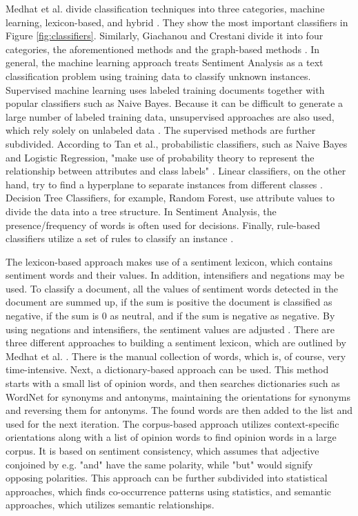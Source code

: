 Medhat et al. divide classification techniques into three categories, machine learning, lexicon-based, and hybrid \cite{MEDHAT20141093}. They show the most important classifiers in Figure \ref{fig:classifiers}. Similarly, Giachanou and Crestani divide it into four categories, the aforementioned methods and the graph-based methods \cite{DBLP:journals/csur/GiachanouC16}. In general, the machine learning approach treats Sentiment Analysis as a text classification problem using training data to classify unknown instances. Supervised machine learning uses labeled training documents together with popular classifiers such as Naive Bayes. Because it can be difficult to generate a large number of labeled training data, unsupervised approaches are also used, which rely solely on unlabeled data \cite{MEDHAT20141093}. The supervised methods are further subdivided. According to Tan et al., probabilistic classifiers, such as Naive Bayes and Logistic Regression, "make use of probability theory to represent the relationship between attributes and class labels" \cite[p.~414]{DBLP:books/aw/TanSKK2019}. Linear classifiers, on the other hand, try to find a hyperplane to separate instances from different classes \cite{MEDHAT20141093}. Decision Tree Classifiers, for example, Random Forest, use attribute values to divide the data into a tree structure. In Sentiment Analysis, the presence/frequency of words is often used for decisions. Finally, rule-based classifiers utilize a set of rules to classify an instance \cite{DBLP:books/aw/TanSKK2019}.

The lexicon-based approach makes use of a sentiment lexicon, which contains sentiment words and their values. In addition, intensifiers and negations may be used. To classify a document, all the values of sentiment words detected in the document are summed up, if the sum is positive the document is classified as negative, if the sum is 0 as neutral, and if the sum is negative as negative. By using negations and intensifiers, the sentiment values are adjusted \cite{liu_2015}. There are three different approaches to building a sentiment lexicon, which are outlined by Medhat et al. \cite{MEDHAT20141093}. There is the manual collection of words, which is, of course, very time-intensive. Next, a dictionary-based approach can be used. This method starts with a small list of opinion words, and then searches dictionaries such as WordNet for synonyms and antonyms, maintaining the orientations for synonyms and reversing them for antonyms. The found words are then added to the list and used for the next iteration. The corpus-based approach utilizes context-specific orientations along with a list of opinion words to find opinion words in a large corpus. It is based on sentiment consistency, which assumes that adjective conjoined by e.g. "and" have the same polarity, while "but" would signify opposing polarities. This approach can be further subdivided into statistical approaches, which finds co-occurrence patterns using statistics, and semantic approaches, which utilizes semantic relationships.









